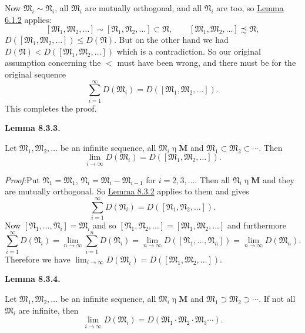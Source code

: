 \documentclass[12pt,b5paper,twoside]{article}
\newcommand{\M}{\mathbf M}
\newcommand{\Lemma}[1]{%
  \par\smallskip\noindent\phantomsection\label{lem:#1}\textbf{Lemma #1.}\enspace
}
\newcommand{\Proof}{\par\noindent\textit{Proof:}\enspace}
\newcommand{\lemref}[1]{\hyperref[lem:#1]{Lemma #1}}
\begin{document}
Now $\mathfrak M_i\sim\mathfrak N_i$, all $\mathfrak M_i$ are mutually
orthogonal, and all $\mathfrak N_i$ are too, so \lemref{6.1.2} applies:
\[
 [\mathfrak M_1,\mathfrak M_2,\ldots]
 \sim[\mathfrak N_1,\mathfrak N_2,\ldots]\subset\mathfrak N,
 \qquad
 [\mathfrak M_1,\mathfrak M_2,\ldots]\precsim\mathfrak N,
\]
$D([\mathfrak M_1,\mathfrak M_2,\ldots])\leq D(\mathfrak N)$. But on the
other hand we had
$D(\mathfrak N)<D([\mathfrak M_1,\mathfrak M_2,\ldots])$ which is a
contradiction. So our original assumption concerning the $<$ must have been
wrong, and there must be for the original sequence
\[
 \sum_{i=1}^\infty D(\mathfrak M_i)
 =D([\mathfrak M_1,\mathfrak M_2,\ldots]).
\]
This completes the proof.

\Lemma{8.3.3}
Let $\mathfrak M_1,\mathfrak M_2,\ldots$ be an infinite sequence, all
$\mathfrak M_i\mathbin\eta\M$ and
$\mathfrak M_1\subset\mathfrak M_2\subset\cdots$. Then
\[
 \lim_{i\to\infty}D(\mathfrak M_i)
 =D([\mathfrak M_1,\mathfrak M_2,\ldots]).
\]

\Proof Put $\mathfrak N_1=\mathfrak M_1$,
$\mathfrak N_i=\mathfrak M_i-\mathfrak M_{i-1}$ for $i=2,3,\ldots$. Then all
$\mathfrak N_i\mathbin\eta\M$ and they are mutually orthogonal. So
\lemref{8.3.2} applies to them and gives
\[
 \sum_{i=1}^\infty D(\mathfrak N_i)
 =D([\mathfrak N_1,\mathfrak N_2,\ldots]).
\]
Now $[\mathfrak N_1,\ldots,\mathfrak N_i]=\mathfrak M_i$ and so
$[\mathfrak N_1,\mathfrak N_2,\ldots]=
[\mathfrak M_1,\mathfrak M_2,\ldots]$ and furthermore
\[
 \sum_{i=1}^\infty D(\mathfrak N_i)
 =\lim_{n\to\infty}\sum_{i=1}^nD(\mathfrak N_i)
 =\lim_{n\to\infty}D([\mathfrak N_1,\ldots,\mathfrak N_n])
 =\lim_{n\to\infty}D(\mathfrak M_n).
\]
Therefore we have
$\lim_{i\to\infty}D(\mathfrak M_i)=
D([\mathfrak M_1,\mathfrak M_2,\ldots])$.

\Lemma{8.3.4}
Let $\mathfrak M_1,\mathfrak M_2,\ldots$ be an infinite sequence, all
$\mathfrak M_i\mathbin\eta\M$ and
$\mathfrak M_1\supset\mathfrak M_2\supset\cdots$. If not all $\mathfrak M_i$
are infinite, then
\[
 \lim_{i\to\infty}D(\mathfrak M_i)
 =D(\mathfrak M_1\cdot\mathfrak M_2\cdot\mathfrak M_3\cdots).
\]
\end{document}
